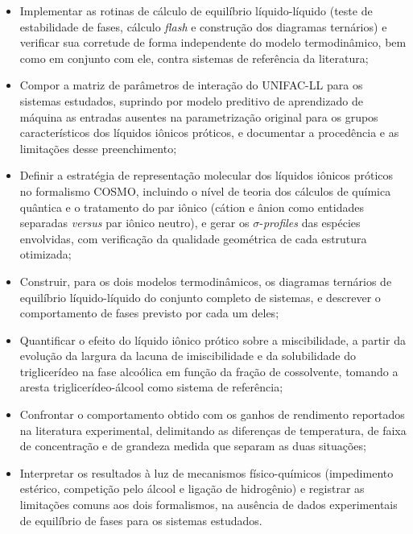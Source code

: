 \begin{itemize}
 
    \item Implementar as rotinas de cálculo de equilíbrio líquido-líquido (teste de estabilidade de fases, cálculo \textit{flash} e construção dos diagramas ternários) e verificar sua corretude de forma independente do modelo termodinâmico, bem como em conjunto com ele, contra sistemas de referência da literatura;
 
    \item Compor a matriz de parâmetros de interação do UNIFAC-LL para os sistemas estudados, suprindo por modelo preditivo de aprendizado de máquina as entradas ausentes na parametrização original para os grupos característicos dos líquidos iônicos próticos, e documentar a procedência e as limitações desse preenchimento;
 
    \item Definir a estratégia de representação molecular dos líquidos iônicos próticos no formalismo COSMO, incluindo o nível de teoria dos cálculos de química quântica e o tratamento do par iônico (cátion e ânion como entidades separadas \textit{versus} par iônico neutro), e gerar os $\sigma$-\textit{profiles} das espécies envolvidas, com verificação da qualidade geométrica de cada estrutura otimizada;
 
    \item Construir, para os dois modelos termodinâmicos, os diagramas ternários de equilíbrio líquido-líquido do conjunto completo de sistemas, e descrever o comportamento de fases previsto por cada um deles;
 
    \item Quantificar o efeito do líquido iônico prótico sobre a miscibilidade, a partir da evolução da largura da lacuna de imiscibilidade e da solubilidade do triglicerídeo na fase alcoólica em função da fração de cossolvente, tomando a aresta triglicerídeo-álcool como sistema de referência;
 
    \item Confrontar o comportamento obtido com os ganhos de rendimento reportados na literatura experimental, delimitando as diferenças de temperatura, de faixa de concentração e de grandeza medida que separam as duas situações;
 
    \item Interpretar os resultados à luz de mecanismos físico-químicos (impedimento estérico, competição pelo álcool e ligação de hidrogênio) e registrar as limitações comuns aos dois formalismos, na ausência de dados experimentais de equilíbrio de fases para os sistemas estudados.
 
\end{itemize}
